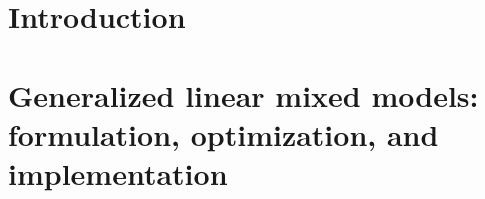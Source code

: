 \documentclass[12pt, %
               openright, %
               oneside, %
               a4paper, %
               chapter=TITLE, %
               section=TITLE, %
               brazil,
               english %
]{abntex2}
\begin{document}
\listoftables*
\cleardoublepage
\makeatletter
\renewcommand\numberline[1]{
	\leftskip -0.7em
	\rightskip 1.6em
	\parfillskip -\rightskip
	\parindent 0em
	\@tempdima 2.0em
	\vspace{0em}
  \advance\leftskip \@tempdima \null\nobreak\hskip -\leftskip
	ALGORITHM \normalfont #1 ~~ }
\makeatother
\listofalgorithms
\cleardoublepage
\makeatletter
\def\numberline#1{\hb@xt@\@tempdima{#1\hfil}}
\makeatother
\tableofcontents*
\cleardoublepage
\textual
\chapter{Introduction}
\label{cap:intro}

\chapter{Generalized linear mixed models: formulation, optimization, and
  implementation}
\label{cap:methods}

\end{document}

